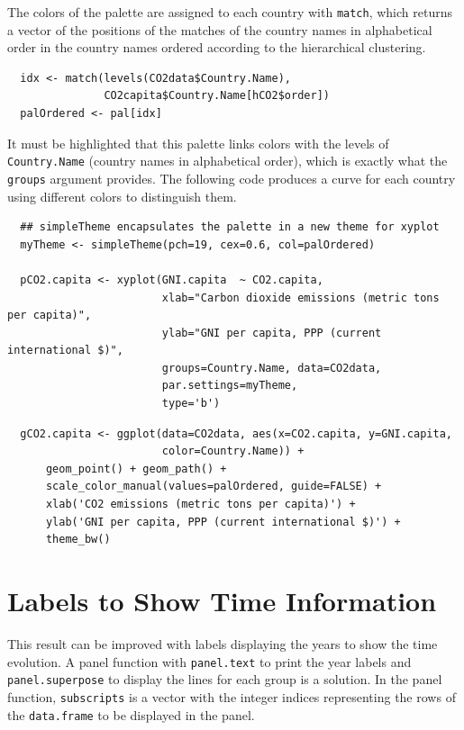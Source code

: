 The colors of the palette are assigned to each country with \texttt{match},
which returns a vector of the positions of the matches of the country
names in alphabetical order in the country names ordered according to
the hierarchical clustering.
\lstset{language=r,label= ,caption= ,captionpos=b,numbers=none}
\begin{lstlisting}
  idx <- match(levels(CO2data$Country.Name), 
               CO2capita$Country.Name[hCO2$order])
  palOrdered <- pal[idx]  
\end{lstlisting}
It must be highlighted that this palette links colors with the levels
of \texttt{Country.Name} (country names in alphabetical order), which is
exactly what the \texttt{groups} argument provides. The following code
produces a curve for each country using different colors to
distinguish them.


\lstset{language=r,label= ,caption= ,captionpos=b,numbers=none}
\begin{lstlisting}
  ## simpleTheme encapsulates the palette in a new theme for xyplot
  myTheme <- simpleTheme(pch=19, cex=0.6, col=palOrdered)
  
  pCO2.capita <- xyplot(GNI.capita  ~ CO2.capita,
                        xlab="Carbon dioxide emissions (metric tons per capita)",
                        ylab="GNI per capita, PPP (current international $)",
                        groups=Country.Name, data=CO2data,
                        par.settings=myTheme,
                        type='b')
\end{lstlisting}

\lstset{language=r,label= ,caption= ,captionpos=b,numbers=none}
\begin{lstlisting}
  gCO2.capita <- ggplot(data=CO2data, aes(x=CO2.capita, y=GNI.capita,
                        color=Country.Name)) +
      geom_point() + geom_path() +
      scale_color_manual(values=palOrdered, guide=FALSE) +
      xlab('CO2 emissions (metric tons per capita)') +
      ylab('GNI per capita, PPP (current international $)') +
      theme_bw()
\end{lstlisting}

\section{Labels to Show Time Information}
\label{sec:orgb1d6814}
This result can be improved with labels displaying the years to show
the time evolution.  A panel function with \texttt{panel.text} to print the
year labels and \texttt{panel.superpose} to display the lines for each group
is a solution. In the panel function, \texttt{subscripts} is a vector with
the integer indices representing the rows of the \texttt{data.frame} to be
displayed in the panel.

